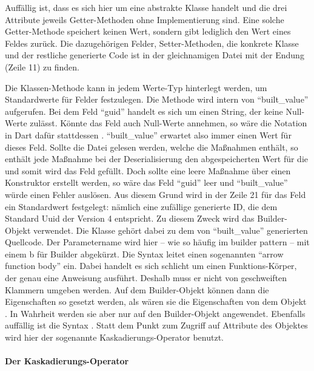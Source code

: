 Auffällig ist, dass es sich hier um eine abstrakte Klasse handelt und die drei Attribute jeweils Getter-Methoden ohne Implementierung sind.
Eine solche Getter-Methode speichert keinen Wert, sondern gibt lediglich den Wert eines Feldes zurück.
Die dazugehörigen Felder,  Setter-Methoden, die konkrete Klasse und der restliche generierte Code ist in der gleichnamigen Datei mit der Endung  (Zeile 11) zu finden.

Die Klassen-Methode  kann in jedem Werte-Typ hinterlegt werden, um Standardwerte für Felder festzulegen.
Die Methode wird intern von \enquote{built_value} aufgerufen.
Bei dem Feld \enquote{guid} handelt es sich um einen String, der keine Null-Werte zulässt.
Könnte das Feld auch Null-Werte annehmen, so wäre die Notation in Dart dafür stattdessen . \enquote{built_value} erwartet also immer einen Wert für dieses Feld. Sollte die Datei gelesen werden, welche die Maßnahmen enthält, so enthält jede Maßnahme bei der Deserialisierung den abgespeicherten Wert für die  und somit wird das Feld gefüllt. Doch sollte eine leere Maßnahme über einen Konstruktor erstellt werden, so wäre das Feld \enquote{guid} leer und \enquote{built_value} würde einen Fehler auslösen. Aus diesem Grund wird in der Zeile 21 für das Feld  ein Standardwert festgelegt: nämlich eine zufällige generierte ID, die dem Standard Uuid der Version 4 entspricht.
Zu diesem Zweck wird das Builder-Objekt verwendet.
Die Klasse  gehört dabei zu dem von \enquote{built_value} generierten Quellcode.
Der Parametername wird hier – wie so häufig im builder pattern – mit einem b für Builder abgekürzt.
Die Syntax \IC{=>} leitet  einen sogenannten \enquote{arrow function body} ein.
Dabei handelt es sich schlicht um einen Funktions-Körper, der genau eine Anweisung ausführt. Deshalb muss er nicht von geschweiften Klammern umgeben werden.
Auf dem Builder-Objekt können dann die Eigenschaften so gesetzt werden, als wären sie die Eigenschaften von dem Objekt .
In Wahrheit werden sie aber nur auf den Builder-Objekt angewendet.  Ebenfalls auffällig ist die Syntax .  Statt dem Punkt zum Zugriff auf Attribute des Objektes wird hier der sogenannte Kaskadierungs-Operator benutzt.

\paragraph{Der Kaskadierungs-Operator}

